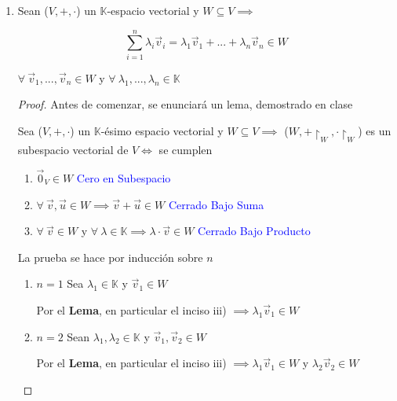 \documentclass[12pt]{article}
\newcommand\K{\ensuremath{\mathbb{K}}}
\begin{document}
\begin{enumerate} 

\item Sean ($V,+,\cdot$) un $\K$-espacio vectorial y $W \subseteq V \implies$

    \begin{equation*}
        \sum_{i=1}^{n}  {\lambda}_{i}{\vec{v}}_{i} =  {\lambda}_{1}{\vec{v}}_{1}+...+ {\lambda}_{n}{\vec{v}}_{n} \in W
    \end{equation*}

    $\forall \: {\vec{v}}_{1},...,{\vec{v}}_{n} \in W$ y $\forall \: {\lambda}_{1},...,{\lambda}_{n} \in \K$

    \begin{proof}
    Antes de comenzar, se enunciará un lema, demostrado en clase

    \begin{lema}
        Sea ($V, +, \cdot$) un $\K$-ésimo espacio vectorial y $W \subseteq V \implies$  ($W,+ \restriction_W,\cdot  {\restriction}_{W}$) es un subespacio vectorial de $V \iff$ se cumplen

    \begin{enumerate}[label={\roman*})]
        \item ${\vec{0}}_{V} \in W$ \hfill \textcolor{blue}{Cero en Subespacio}
        \item $\forall \: \vec{v}, \vec{u} \in W \implies \vec{v} + \vec{u} \in W $ \hfill \textcolor{blue}{Cerrado Bajo Suma}
        \item $\forall \: \vec{v} \in W $ y $\forall \: \lambda \in \K \implies \lambda \cdot \vec{v} \in W$ \hfill \textcolor{blue}{Cerrado Bajo Producto}
    \end{enumerate}
    \end{lema}
    
    La prueba se hace por inducción sobre $n$

    \begin{enumerate}
        \item $n=1$ Sea ${\lambda}_{1} \in\K$ y ${\vec{v}}_{1} \in W$

        Por el \textbf{Lema}, en particular el inciso iii) $\implies {\lambda}_{1}{\vec{v}}_{1} \in W $

        \item $n=2$ Sean ${\lambda}_{1},{\lambda}_{2} \in\K$ y ${\vec{v}}_{1},{\vec{v}}_{2} \in W$

        Por el \textbf{Lema}, en particular el inciso iii) $\implies {\lambda}_{1}{\vec{v}}_{1} \in W$ y ${\lambda}_{2}{\vec{v}}_{2} \in W$


\end{enumerate}
\end{proof}
\end{enumerate}
\end{document}
